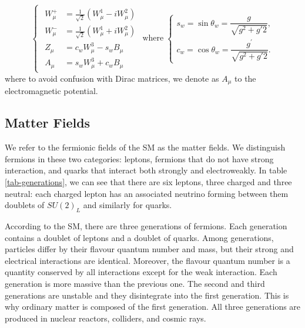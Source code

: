 \begin{equation}
\begin{cases}
	\begin{aligned}
		W_{\mu}^{+} &=\frac{1}{\sqrt{2}}\left(W_{\mu}^{1}-i W_{\mu}^{2}\right) \\
		W_{\mu}^{-} &=\frac{1}{\sqrt{2}}\left(W_{\mu}^{1}+i W_{\mu}^{2}\right) \\
		Z_{\mu} &=c_{w} W_{\mu}^{3}-s_{w} B_{\mu} \\
		A_{\mu} &=s_{w} W_{\mu}^{3}+c_{w} B_{\mu}
	\end{aligned}
\end{cases}
\text{where}
\;
\begin{cases}
	s_{w}=\sin \theta_{w}=\dfrac{g}{\sqrt{g^{2}+g{\prime2}}},\\
	c_{w}=\cos \theta_{w}=\dfrac{g^\prime}{\sqrt{g^{2}+g{\prime2}}}.
\end{cases}
\end{equation}
where to avoid confusion with Dirac matrices, we denote as $A_\mu$ to the electromagnetic potential.
\subsection{Matter Fields}
We refer to the fermionic fields of the SM as the matter fields. We distinguish fermions in these two categories: leptons, fermions that do not have strong interaction, and quarks that interact both strongly and electroweakly. In table \ref{tab-generations}, we can see that there are six leptons, three charged and three neutral: each charged lepton has an associated neutrino forming between them doublets of $SU(2)_L$ and similarly for quarks. 

According to the SM, there are three generations of fermions. Each generation contains a doublet of leptons and a doublet of quarks. Among generations, particles differ by their flavour quantum number and mass, but their strong and electrical interactions are identical. Moreover, the flavour quantum number is a quantity conserved by all interactions except for the weak interaction.  Each generation is more massive than the previous one. The second and third generations are unstable and they disintegrate into the first generation. This is why ordinary matter is composed of the first generation. All three generations are produced in nuclear reactors, colliders, and cosmic rays. 

